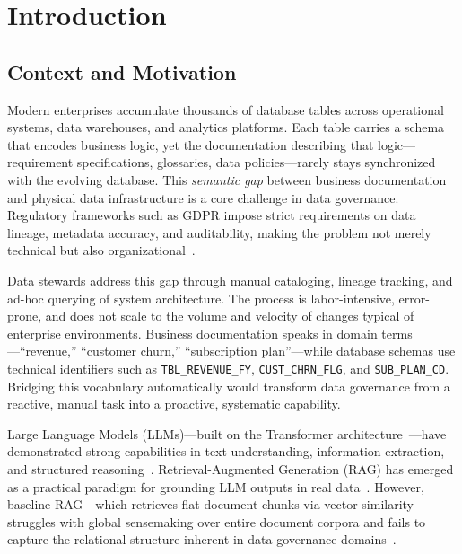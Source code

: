 \chapter{Introduction}
\label{ch:introduction}

\section{Context and Motivation}
\label{sec:intro:motivation}

Modern enterprises accumulate thousands of database tables across operational systems, data warehouses, and analytics platforms. Each table carries a schema that encodes business logic, yet the documentation describing that logic---requirement specifications, glossaries, data policies---rarely stays synchronized with the evolving database. This \emph{semantic gap} between business documentation and physical data infrastructure is a core challenge in data governance. Regulatory frameworks such as GDPR impose strict requirements on data lineage, metadata accuracy, and auditability, making the problem not merely technical but also organizational~\cite{eu2016generaldataprotectionregulation}.

Data stewards address this gap through manual cataloging, lineage tracking, and ad-hoc querying of system architecture. The process is labor-intensive, error-prone, and does not scale to the volume and velocity of changes typical of enterprise environments. Business documentation speaks in domain terms---``revenue,'' ``customer churn,'' ``subscription plan''---while database schemas use technical identifiers such as \texttt{TBL\_REVENUE\_FY}, \texttt{CUST\_CHRN\_FLG}, and \texttt{SUB\_PLAN\_CD}. Bridging this vocabulary automatically would transform data governance from a reactive, manual task into a proactive, systematic capability.

Large Language Models (LLMs)---built on the Transformer architecture~\cite{vaswani2017attentionisallyouneed}---have demonstrated strong capabilities in text understanding, information extraction, and structured reasoning~\cite{brown2020languagemodelsarefewshotlearners}. Retrieval-Augmented Generation (RAG) has emerged as a practical paradigm for grounding LLM outputs in real data~\cite{gao2024retrievalaugmentedgenerationlargelanguage}. However, baseline RAG---which retrieves flat document chunks via vector similarity---struggles with global sensemaking over entire document corpora and fails to capture the relational structure inherent in data governance domains~\cite{edge2025localglobalgraphrag}.

